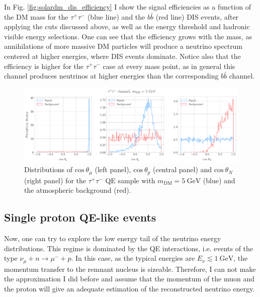 In Fig. \ref{fig:solardm_dis_efficiency} I show the signal efficiencies as a function of the DM mass for the $\tau^{+} \tau^{-}$ (blue line) and the $b\bar{b}$ (red line) DIS events, after applying the cuts discussed above, as well as the energy threshold and hadronic visible energy selections. One can see that the efficiency grows with the mass, as annihilations of more massive DM particles will produce a neutrino spectrum centered at higher energies, where DIS events dominate. Notice also that the efficiency is higher for the $\tau^{+} \tau^{-}$ case at every mass point, as in general this channel produces neutrinos at higher energies than the corresponding $b\bar{b}$ channel.

\begin{figure}[t]
	\centering
	\includegraphics[width=0.95\linewidth]{Images/DM_Analysis/solardm_tau_5_qel_angular_dists.pdf}
	\caption[Angular distributions for the $\tau^{+}\tau^{-}$ QE sample with $m_{\mathrm{DM}} = 5 \ \mathrm{GeV}$ and the atmospheric background.]{Distributions of $\mathrm{cos} \ \theta_{\mu}$ (left panel), $\mathrm{cos} \ \theta_{p}$ (central panel) and $\mathrm{cos} \ \theta_{N}$ (right panel) for the $\tau^{+}\tau^{-}$ QE sample with $m_{\mathrm{DM}} = 5 \ \mathrm{GeV}$ (blue) and the atmospheric background (red).}
	\label{fig:solardm_tau_5_qel_angular_dists}
\end{figure}

\subsection{Single proton QE-like events}

Now, one can try to explore the low energy tail of the neutrino energy distributions. This regime is dominated by the QE interactions, i.e. events of the type $\nu_{\mu} + n \rightarrow \mu^{-} + p$. In this case, as the typical energies are $E_{\nu} \lesssim 1 \ \mathrm{GeV}$, the momentum transfer to the remnant nucleus is sizeable. Therefore, I can not make the approximation I did before and assume that the momentum of the muon and the proton will give an adequate estimation of the reconstructed neutrino energy.

